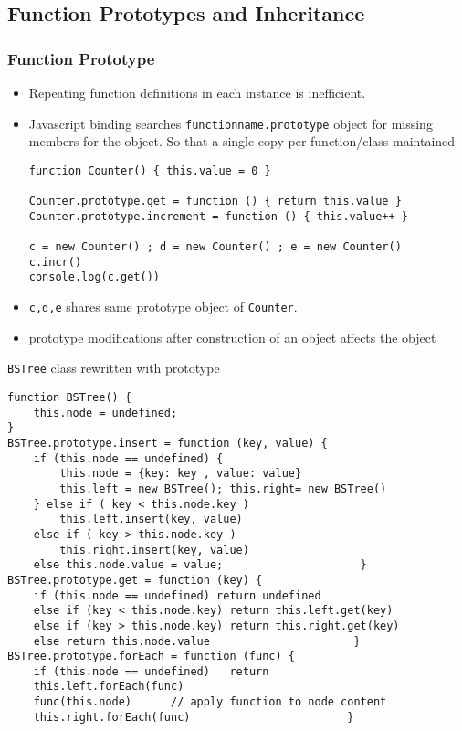 \documentclass[trans,compress,xcolor=table]{beamer}
\begin{document}
\subsection{Function Prototypes and Inheritance}
\begin{frame}[fragile]
\frametitle{Function Prototype}
\begin{itemize}
\item Repeating function definitions in each instance is inefficient.
\item Javascript binding searches \lstinline!functionname.prototype! object
for missing members for the object. So that a single copy per function/class maintained
\begin{lstlisting}
function Counter() { this.value = 0 }

Counter.prototype.get = function () { return this.value }
Counter.prototype.increment = function () { this.value++ }

c = new Counter() ; d = new Counter() ; e = new Counter()
c.incr()
console.log(c.get())
\end{lstlisting}
\item \lstinline!c,d,e!  shares same prototype object of \lstinline!Counter!.
\item \alert{prototype modifications after construction of an object affects the object}
\end{itemize}
\end{frame}

\begin{frame}[fragile]
\lstinline!BSTree! class rewritten with prototype
\begin{lstlisting}
function BSTree() {
    this.node = undefined;	
}
BSTree.prototype.insert = function (key, value) {
    if (this.node == undefined) {
        this.node = {key: key , value: value}
        this.left = new BSTree(); this.right= new BSTree()
    } else if ( key < this.node.key ) 
        this.left.insert(key, value)
    else if ( key > this.node.key )
        this.right.insert(key, value)
    else this.node.value = value;                     } 
BSTree.prototype.get = function (key) {
    if (this.node == undefined) return undefined
    else if (key < this.node.key) return this.left.get(key)
    else if (key > this.node.key) return this.right.get(key)
    else return this.node.value                      }
BSTree.prototype.forEach = function (func) {
    if (this.node == undefined)   return
    this.left.forEach(func)
    func(this.node)      // apply function to node content
    this.right.forEach(func)                        }
\end{lstlisting}
\end{frame}
\end{document}
